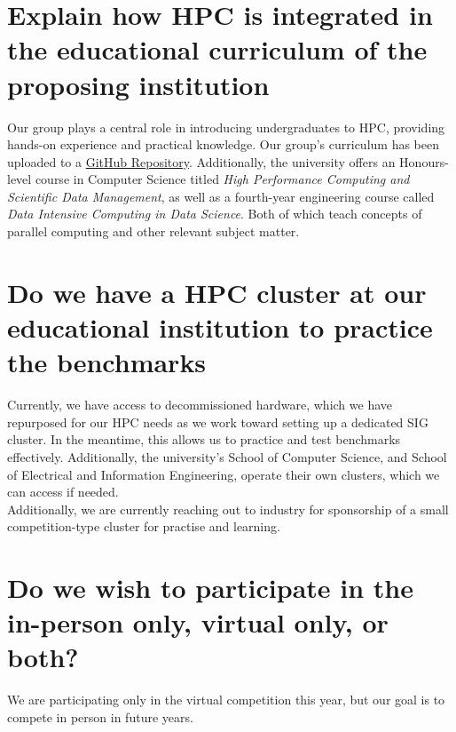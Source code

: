 \documentclass[10pt, onecolumn]{IEEEtran}
\begin{document}
\section{Explain how HPC is integrated in the educational curriculum of the proposing institution}
\noindent
Our group plays a central role in introducing undergraduates to HPC, providing hands-on experience and practical knowledge. Our group's curriculum has been uploaded to a \href{https://github.com/WitsHPC/HPC-InterestGroup}{GitHub Repository}. Additionally, the university offers an Honours-level course in Computer Science titled \textit{High Performance Computing and Scientific Data Management}, as well as a fourth-year engineering course called \textit{Data Intensive Computing in Data Science}. Both of which teach concepts of parallel computing and other relevant subject matter.
\section{Do we have a HPC cluster at our educational institution to practice the benchmarks}
\noindent
Currently, we have access to decommissioned hardware, which we have repurposed for our HPC needs as we work toward setting up a dedicated SIG cluster. In the meantime, this allows us to practice and test benchmarks effectively. Additionally, the university’s School of Computer Science, and School of Electrical and Information Engineering, operate their own clusters, which we can access if needed.
\\
Additionally, we are currently reaching out to industry for sponsorship of a small competition-type cluster for practise and learning.
\section{Do we wish to participate in the in-person only, virtual only, or both?}
\noindent
We are participating only in the virtual competition this year, but our goal is to compete in person in future years.
%
%
\label{lastBodyPage}
\newpage
{}
\appendices
\label{lastRomanPage}
\end{document}
